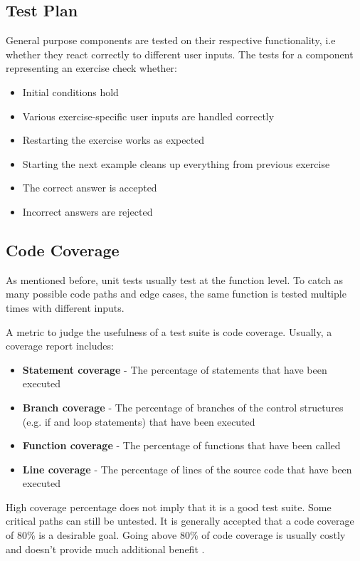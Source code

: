 \subsection*{Test Plan}

General purpose components are tested on their respective functionality, i.e whether they react correctly to different user inputs. The tests for a component representing an exercise check whether:

\begin{itemize}
    \item Initial conditions hold
    \item Various exercise-specific user inputs are handled correctly
    \item Restarting the exercise works as expected
    \item Starting the next example cleans up everything from previous exercise
    \item The correct answer is accepted
    \item Incorrect answers are rejected
\end{itemize}

\subsection*{Code Coverage}
As mentioned before, unit tests usually test at the function level. To catch as many possible code paths and edge cases, the same function is tested multiple times with different inputs. 

A metric to judge the usefulness of a test suite is code coverage. Usually, a coverage report includes:

\begin{itemize}
    \item \textbf{Statement coverage} - The percentage of statements that have been executed 
    \item \textbf{Branch coverage} - The percentage of branches of the control structures (e.g. if and loop statements) that have been executed
    \item \textbf{Function coverage} - The percentage of functions that have been called
    \item \textbf{Line coverage} - The percentage of lines of the source code that have been executed
\end{itemize}

High coverage percentage does not imply that it is a good test suite. Some critical paths can still be untested. It is generally accepted that a code coverage of 80\% is a desirable goal. Going above 80\% of code coverage is usually costly and doesn't provide much additional benefit \cite{CodeCoverage}.

